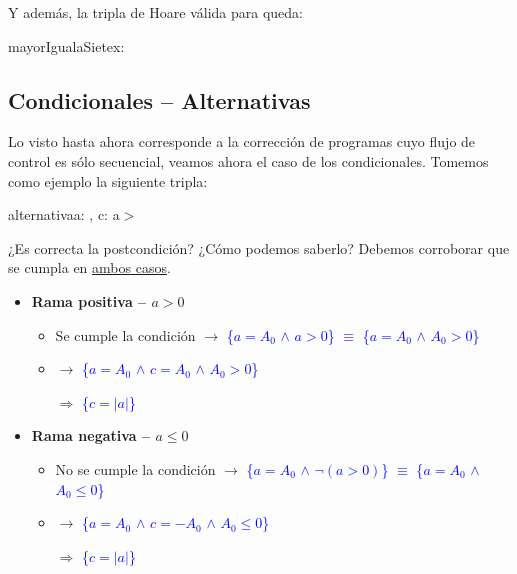 \documentclass[../main.tex]{subfiles}
\begin{document}
Y además, la tripla de Hoare válida para  queda:

\begin{proc}{mayorIgualaSiete}{\Inout x: \Z}{}
        \par
         \par
\end{proc} \label{specification_example_2_final}

\subsection{Condicionales -- Alternativas}

Lo visto hasta ahora corresponde a la corrección de programas cuyo flujo de control es sólo secuencial, veamos ahora el caso de los condicionales.
Tomemos como ejemplo la siguiente tripla:

\begin{proc}{alternativa}{\In a: \Z, \Out c: \Z}{}
     a\;$>$  \par
    \;\;   \par
              \par
    \;\;   \par
             \par
\end{proc} \label{specification_example_3_triplet}

¿Es correcta la postcondición? ¿Cómo podemos saberlo? Debemos corroborar que se cumpla en \ul{ambos casos}.

\begin{itemize}
    \item \textbf{Rama positiva -- $a > 0$}
          \begin{itemize}[label=$\;$]
            \item Se cumple la condición $\rightarrow$ \textcolor{blue}{\{$a = A_0$ $\land$ $a > 0$\} $\equiv$ \{$a = A_0$ $\land$ $A_0 > 0$\}}
            \item {} $\rightarrow$ \textcolor{blue}{\{$a = A_0$ $\land$ $c = A_0$ $\land$ $A_0 > 0$\}}
            \item[$\Rightarrow$] \textcolor{blue}{\{$c = |a|$\}}
          \end{itemize}
    \item \textbf{Rama negativa -- $a \leq 0$}
    \begin{itemize}[label=$\;$]
        \item No se cumple la condición $\rightarrow$ \textcolor{blue}{\{$a = A_0$ $\land$ $\neg(a > 0)$\} $\equiv$ \{$a = A_0$ $\land$ $A_0 \leq 0$\}}
        \item {} $\rightarrow$ \textcolor{blue}{\{$a = A_0$ $\land$ $c = -A_0$ $\land$ $A_0 \leq 0$\}}
        \item[$\Rightarrow$] \textcolor{blue}{\{$c = |a|$\}}
      \end{itemize}
\end{itemize}
\end{document}
